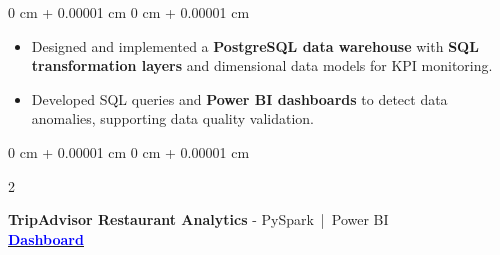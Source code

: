 \documentclass[10pt, letterpaper]{article}
\newenvironment{highlights}{
    \begin{itemize}[
        topsep=0.04 cm,
        parsep=0.02cm,
        partopsep=0pt,
        itemsep=0pt,
        leftmargin=0 cm + 10pt
    ]
}{
    \end{itemize}
} %
\newcommand{\stronglink}[2]{%
    \href{#1}{\textbf{\uline{\textcolor{blue}{#2}}}}%
}
\newenvironment{onecolentry}{
    \begin{adjustwidth}{
        0 cm + 0.00001 cm
    }{
        0 cm + 0.00001 cm
    }
}{
    \end{adjustwidth}
} %
\newenvironment{twocolentry}[2][]{
    \onecolentry
    \def\secondColumn{#2}
    \setcolumnwidth{\fill, 3.8 cm}
    \begin{paracol}{2}
}{
    \switchcolumn \raggedleft \secondColumn
    \end{paracol}
    \endonecolentry
} %
\begin{document}
    \begin{onecolentry}
        \begin{highlights}
            \item Designed and implemented a \textbf{PostgreSQL data warehouse} with \textbf{SQL transformation layers} and dimensional data models for KPI monitoring.
            \item{Developed SQL queries and \textbf{Power BI dashboards} to detect data anomalies, supporting data quality validation.}
        \end{highlights}
    \end{onecolentry}

        \vspace{0.20cm}

        \begin{twocolentry}{
        \stronglink{https://app.powerbi.com/view?r=eyJrIjoiYjMzYTk5NjktMDA4Mi00YmM2LWJhMGYtM2M0N2YzZWIwNDdkIiwidCI6IjYxZjNlM2I4LTliNTItNDMzYS1hNGViLWM2NzMzNGNlNTRkNSIsImMiOjh9&pageName=76c568acade65b1d5887}{Dashboard}
    }
        \textbf{TripAdvisor Restaurant Analytics} - 
        PySpark \,|\, Power BI \\
        \end{twocolentry}
    
        \vspace{0.10cm}
    
\end{document}
